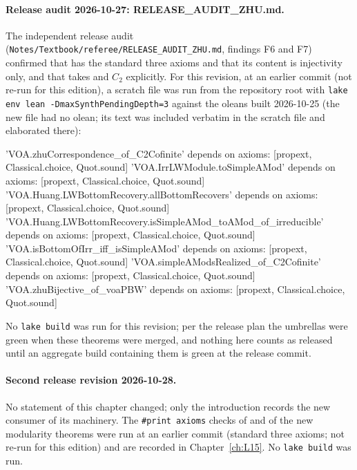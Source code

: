 \paragraph{Release audit 2026-10-27: RELEASE\_AUDIT\_ZHU.md.} The independent release audit
(\texttt{Notes/\allowbreak Textbook/\allowbreak referee/\allowbreak RELEASE\_AUDIT\_ZHU.md}, findings F6 and F7) confirmed that
 has the standard three axioms and that its content is injectivity only, and that
 takes  and $C_2$ explicitly. For this revision, at an earlier commit (not re-run for this edition), a
scratch file was run from the repository root with \texttt{lake env lean -DmaxSynthPendingDepth=3} against the oleans built
2026-10-25 (the new file  had no olean; its text was included verbatim in the scratch file
and elaborated there):
\begin{plaincode}
'VOA.zhuCorrespondence_of_C2Cofinite' depends on axioms: [propext, Classical.choice, Quot.sound]
'VOA.IrrLWModule.toSimpleAMod' depends on axioms: [propext, Classical.choice, Quot.sound]
'VOA.Huang.LWBottomRecovery.allBottomRecovers' depends on axioms: [propext, Classical.choice, Quot.sound]
'VOA.Huang.LWBottomRecovery.isSimpleAMod_toAMod_of_irreducible' depends on axioms: [propext, Classical.choice, Quot.sound]
'VOA.isBottomOfIrr_iff_isSimpleAMod' depends on axioms: [propext, Classical.choice, Quot.sound]
'VOA.simpleAModsRealized_of_C2Cofinite' depends on axioms: [propext, Classical.choice, Quot.sound]
'VOA.zhuBijective_of_voaPBW' depends on axioms: [propext, Classical.choice, Quot.sound]
\end{plaincode}
No \texttt{lake build} was run for this revision; per the release plan the umbrellas were green when these theorems were
merged, and nothing here counts as released until an aggregate build containing them is green at the release commit.

\paragraph{Second release revision 2026-10-28.} No statement of this chapter changed; only the introduction records the new
consumer of its machinery. The \texttt{\#print axioms} checks of \allowbreak{}\allowbreak{}\allowbreak{}
and of the new modularity theorems were run at an earlier commit (standard three axioms; not re-run for this edition) and are recorded in
Chapter~\ref{ch:L15}. No \texttt{lake build} was run.

